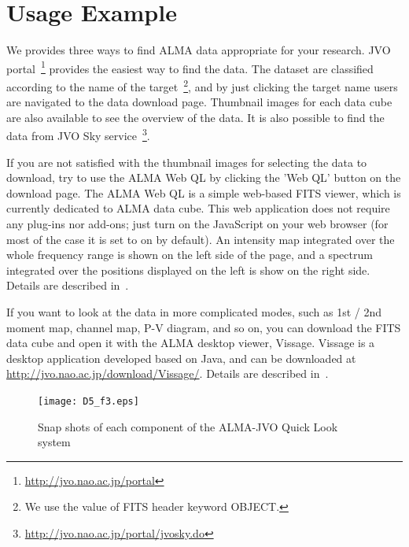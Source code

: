 \documentclass[11pt,twoside]{article}
\begin{document}
\section{Usage Example}

We provides three ways to find ALMA data appropriate for your research.
JVO portal~\footnote{\url{http://jvo.nao.ac.jp/portal}}\citep{Shirasaki_2011} 
provides the easiest way to find the data.
The dataset are classified according to the name of the target~\footnote{We use the 
value of FITS header keyword OBJECT.}, and by just clicking the target name
users are navigated to the data download page.
Thumbnail images for each data cube are also available to see the overview of 
the data.
It is also possible to find the data from JVO Sky 
service~\footnote{\url{http://jvo.nao.ac.jp/portal/jvosky.do}}.

If you are not satisfied with the thumbnail images for selecting the data to download,
try to use the ALMA Web QL by clicking the 'Web QL' button on the download page.
The ALMA Web QL is a simple web-based FITS viewer, which is currently dedicated 
to ALMA data cube.
This web application does not require any plug-ins nor add-ons; just turn on
the JavaScript on your web browser (for most of the case it is set to on by default).
An intensity map integrated over the whole frequency range is shown on the left side
of the page, and a spectrum integrated over the positions displayed on the left
is show on the right side.
Details are described in~\cite{O10_adassxxii}.

If you want to look at the data in more complicated modes, such as 
1st / 2nd moment map, channel map, P-V diagram, and so on, you can download the 
FITS data cube and open it with the ALMA desktop viewer, Vissage.
Vissage is a desktop application developed based on Java, and can be
downloaded at \url{http://jvo.nao.ac.jp/download/Vissage/}.
Details are described in~\cite{P047_adassxxii}.


\begin{figure}[t]
\begin{center}
\texttt{[image: D5\_f3.eps]}
\caption{Snap shots of each component of the ALMA-JVO Quick Look system}
\label{fig:arch}
\end{center}
\end{figure}




\end{document}
